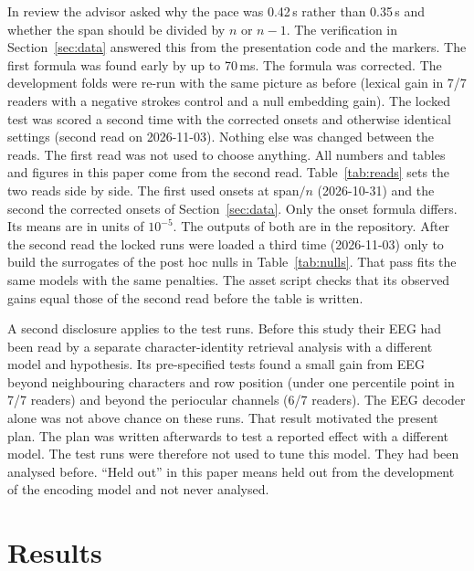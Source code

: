 \documentclass[sigconf]{acmart}
\begin{document}
In review the advisor asked why the pace was 0.42\,s rather than 0.35\,s and whether the span should be divided by $n$ or $n-1$. The verification in Section~\ref{sec:data} answered this from the presentation code and the markers. The first formula was found early by up to 70\,ms. The formula was corrected. The development folds were re-run with the same picture as before (lexical gain in 7/7 readers with a negative strokes control and a null embedding gain). The locked test was scored a second time with the corrected onsets and otherwise identical settings (second read on 2026-11-03). Nothing else was changed between the reads. The first read was not used to choose anything. All numbers and tables and figures in this paper come from the second read. Table~\ref{tab:reads} sets the two reads side by side. The first used onsets at span$/n$ (2026-10-31) and the second the corrected onsets of Section~\ref{sec:data}. Only the onset formula differs. Its means are in units of $10^{-5}$. The outputs of both are in the repository. After the second read the locked runs were loaded a third time (2026-11-03) only to build the surrogates of the post hoc nulls in Table~\ref{tab:nulls}. That pass fits the same models with the same penalties. The asset script checks that its observed gains equal those of the second read before the table is written.

A second disclosure applies to the test runs. Before this study their EEG had been read by a separate character-identity retrieval analysis with a different model and hypothesis. Its pre-specified tests found a small gain from EEG beyond neighbouring characters and row position (under one percentile point in 7/7 readers) and beyond the periocular channels (6/7 readers). The EEG decoder alone was not above chance on these runs. That result motivated the present plan. The plan was written afterwards to test a reported effect with a different model. The test runs were therefore not used to tune this model. They had been analysed before. ``Held out'' in this paper means held out from the development of the encoding model and not never analysed.

\section{Results}
\label{sec:results}
\begin{table}
\caption{Locked test per reader.}
\label{tab:subjects}
\small

\end{table}
\end{document}
